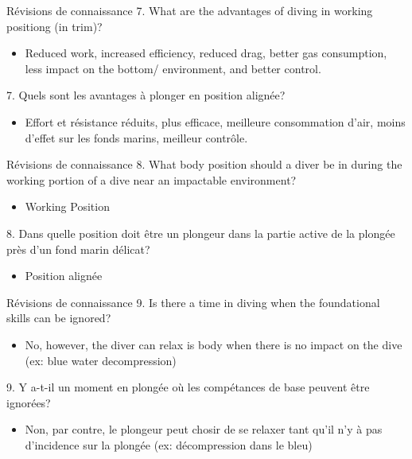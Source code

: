 \begin{frame}{Révisions de connaissance}  
	7. What are the advantages of diving in working positiong (in trim)?
	\begin{itemize}
		\item Reduced work, increased efficiency, reduced drag, better gas consumption, less impact on the bottom/ environment, and better control.
	\end{itemize}

	\vfill
	
	7. Quels sont les avantages à plonger en position alignée?
	\begin{itemize}
		\item Effort et résistance réduits, plus efficace, meilleure consommation d'air, moins d'effet sur les fonds marins, meilleur contrôle.
	\end{itemize}
\end{frame}

\begin{frame}{Révisions de connaissance}  
	8. What body position should a diver be in during the working portion of a dive near an impactable environment?
	\begin{itemize}
		\item Working Position
	\end{itemize}

	\vfill

	8. Dans quelle position doit être un plongeur dans la partie active de la plongée près d'un fond marin délicat?
	\begin{itemize}
	 	\item Position alignée
	 \end{itemize} 
\end{frame}

\begin{frame}{Révisions de connaissance}  
	9. Is there a time in diving when the foundational skills can be ignored?
	\begin{itemize}
		\item No, however, the diver can relax is body when there is no impact on the dive (ex: blue water decompression)
	\end{itemize}

	\vfill

	9. Y a-t-il un moment en plongée où les compétances de base peuvent être ignorées?
	\begin{itemize}
		\item Non, par contre, le plongeur peut chosir de se relaxer tant qu'il n'y à pas d'incidence sur la plongée (ex: décompression dans le bleu)
	\end{itemize}


\end{frame}
